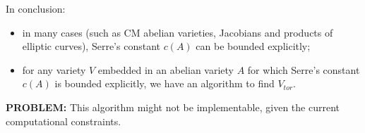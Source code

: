 \documentclass[handout]{beamer}
\begin{document}

\begin{frame}
In conclusion: 
\begin{itemize}
	\item in many cases (such as CM abelian varieties, Jacobians and products of elliptic curves), Serre's constant $c(A)$ can be bounded explicitly; \pause
	\item for any variety $V$ embedded in  an abelian variety $A$ for which Serre's constant $c(A)$ is bounded explicitly, we have an algorithm to find $V_{tor}$. \pause
\end{itemize}

\vspace{0.5cm}
\textbf{PROBLEM:} \qquad This algorithm might not be implementable, given the current computational constraints.

\end{frame}
\end{document}
